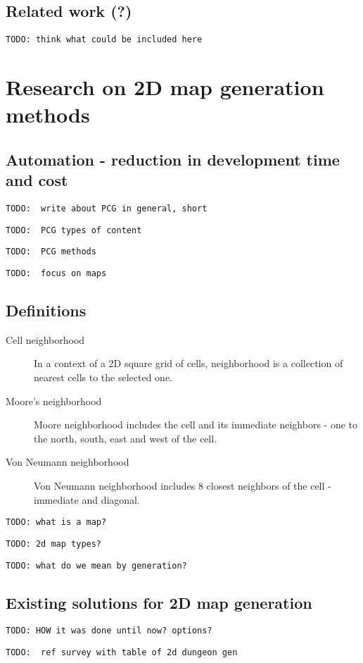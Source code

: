 \documentclass[12pt]{report}
\newcommand{\todo}[1]{}
\renewcommand{\todo}[1]{{\color{red} \par \noindent \footnotesize \texttt{TODO: {#1} }}}
\begin{document}
\section{Related work (?)} 

\todo{think what could be included here}

\chapter{Research on 2D map generation methods} \label{rozdzial.teoria}



\section{ Automation - reduction in development time and cost}



\todo{ write about PCG in general, short }
\todo{ PCG types of content }
\todo{ PCG methods }
\todo{ focus on maps }

\section{Definitions} 

\begin{description}
	\item[Cell neighborhood] In a context of a 2D square grid of cells, neighborhood is a collection of nearest cells to the selected one.
	\item[Moore's neighborhood]  Moore neighborhood includes the cell and its immediate neighbors - one to the north, south, east and west of the cell.
	\item[Von Neumann neighborhood] Von Neumann neighborhood includes 8 closest neighbors of the cell - immediate and diagonal.
\end{description}

\todo{what is a map?}
\todo{2d map types?}
\todo{what do we mean by generation?}



\section{Existing solutions for 2D map generation}

\todo{HOW it was done until now? options?}
\todo{ ref survey with table of 2d dungeon gen}
\end{document}

